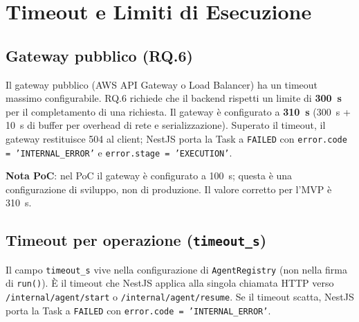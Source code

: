 \documentclass[11pt,a4paper]{article}
\begin{document}
\section{Timeout e Limiti di Esecuzione}
\label{sec:be-timeout}

\subsection{Gateway pubblico (RQ.6)}

Il gateway pubblico (AWS API Gateway o Load Balancer) ha un timeout massimo configurabile. RQ.6 richiede che il backend rispetti un limite di \textbf{300~s} per il completamento di una richiesta. Il gateway è configurato a \textbf{310~s} (300~s + 10~s di buffer per overhead di rete e serializzazione). Superato il timeout, il gateway restituisce 504 al client; NestJS porta la Task a \texttt{FAILED} con \texttt{error.code = 'INTERNAL\_ERROR'} e \texttt{error.stage = 'EXECUTION'}.

\textbf{Nota PoC}: nel PoC il gateway è configurato a 100~s; questa è una configurazione di sviluppo, non di produzione. Il valore corretto per l'MVP è 310~s.

\subsection{Timeout per operazione (\texttt{timeout\_s})}

Il campo \texttt{timeout\_s} vive nella configurazione di \texttt{AgentRegistry} (non nella firma di \texttt{run()}). È il timeout che NestJS applica alla singola chiamata HTTP verso \texttt{/internal/agent/start} o \texttt{/internal/agent/resume}. Se il timeout scatta, NestJS porta la Task a \texttt{FAILED} con \texttt{error.code = 'INTERNAL\_ERROR'}.
\end{document}

